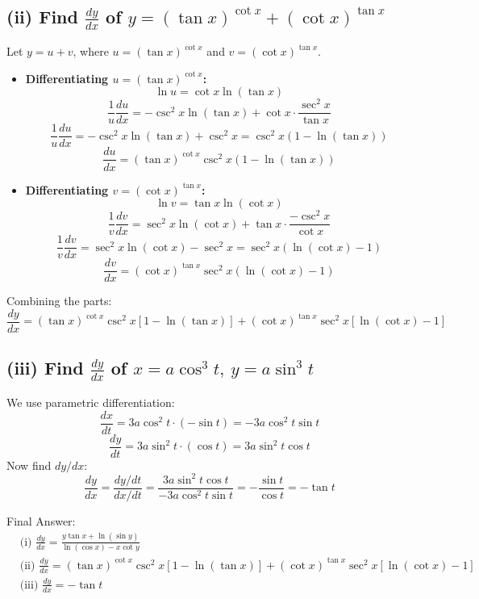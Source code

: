 \documentclass[11pt, a4paper]{article}
\begin{document}
\subsection*{(ii) Find $\frac{dy}{dx}$ of $y = (\tan x)^{\cot x} + (\cot x)^{\tan x}$}
Let $y = u + v$, where $u = (\tan x)^{\cot x}$ and $v = (\cot x)^{\tan x}$.
\begin{itemize}
    \item \textbf{Differentiating $u = (\tan x)^{\cot x}$:}
    \[ \ln u = \cot x \ln(\tan x) \]
    \[ \frac{1}{u}\frac{du}{dx} = -\csc^2 x \ln(\tan x) + \cot x \cdot \frac{\sec^2 x}{\tan x} \]
    \[ \frac{1}{u}\frac{du}{dx} = -\csc^2 x \ln(\tan x) + \csc^2 x = \csc^2 x (1 - \ln(\tan x)) \]
    \[ \frac{du}{dx} = (\tan x)^{\cot x} \csc^2 x (1 - \ln(\tan x)) \]

    \item \textbf{Differentiating $v = (\cot x)^{\tan x}$:}
    \[ \ln v = \tan x \ln(\cot x) \]
    \[ \frac{1}{v}\frac{dv}{dx} = \sec^2 x \ln(\cot x) + \tan x \cdot \frac{-\csc^2 x}{\cot x} \]
    \[ \frac{1}{v}\frac{dv}{dx} = \sec^2 x \ln(\cot x) - \sec^2 x = \sec^2 x (\ln(\cot x) - 1) \]
    \[ \frac{dv}{dx} = (\cot x)^{\tan x} \sec^2 x (\ln(\cot x) - 1) \]
\end{itemize}
Combining the parts:
\[ \frac{dy}{dx} = (\tan x)^{\cot x} \csc^2 x [1 - \ln(\tan x)] + (\cot x)^{\tan x} \sec^2 x [\ln(\cot x) - 1] \]

\subsection*{(iii) Find $\frac{dy}{dx}$ of $x = a\cos^3 t, \ y = a\sin^3 t$}
We use parametric differentiation:
\[ \frac{dx}{dt} = 3a\cos^2 t \cdot (-\sin t) = -3a\cos^2 t \sin t \]
\[ \frac{dy}{dt} = 3a\sin^2 t \cdot (\cos t) = 3a\sin^2 t \cos t \]
Now find $dy/dx$:
\[ \frac{dy}{dx} = \frac{dy/dt}{dx/dt} = \frac{3a\sin^2 t \cos t}{-3a\cos^2 t \sin t} = -\frac{\sin t}{\cos t} = -\tan t \]

Final Answer:
\[ 
\boxed{
\begin{aligned}
&\text{(i) } \frac{dy}{dx} = \frac{y \tan x + \ln(\sin y)}{\ln(\cos x) - x \cot y} \\
&\text{(ii) } \frac{dy}{dx} = (\tan x)^{\cot x} \csc^2 x [1 - \ln(\tan x)] + (\cot x)^{\tan x} \sec^2 x [\ln(\cot x) - 1] \\
&\text{(iii) } \frac{dy}{dx} = -\tan t
\end{aligned}
} 
\]

\end{document}
